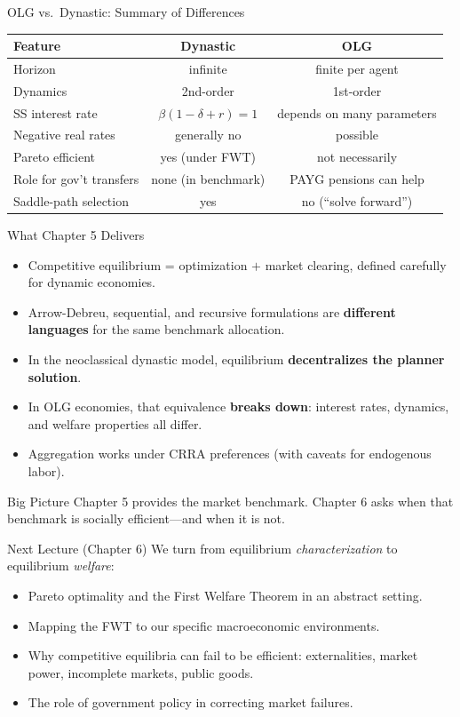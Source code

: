 \documentclass[aspectratio=169,10pt]{beamer}
\begin{document}
\begin{frame}{OLG vs.\ Dynastic: Summary of Differences}
\begin{center}
\begin{tabular}{lcc}
\toprule
\textbf{Feature} & \textbf{Dynastic} & \textbf{OLG} \\
\midrule
Horizon & infinite & finite per agent \\
Dynamics & 2nd-order & 1st-order \\
SS interest rate & $\beta(1-\delta+r)=1$ & depends on many parameters \\
Negative real rates & generally no & possible \\
Pareto efficient & yes (under FWT) & not necessarily \\
Role for gov't transfers & none (in benchmark) & PAYG pensions can help \\
Saddle-path selection & yes & no (``solve forward'') \\
\bottomrule
\end{tabular}
\end{center}
\end{frame}

\begin{frame}{What Chapter 5 Delivers}
\begin{itemize}
  \item Competitive equilibrium = optimization $+$ market clearing, defined carefully for dynamic economies.
  \item Arrow-Debreu, sequential, and recursive formulations are \textbf{different languages} for the same benchmark allocation.
  \item In the neoclassical dynastic model, equilibrium \textbf{decentralizes the planner solution}.
  \item In OLG economies, that equivalence \textbf{breaks down}: interest rates, dynamics, and welfare properties all differ.
  \item Aggregation works under CRRA preferences (with caveats for endogenous labor).
\end{itemize}

\begin{block}{Big Picture}
Chapter 5 provides the market benchmark. Chapter 6 asks when that benchmark is socially efficient---and when it is not.
\end{block}
\end{frame}

\begin{frame}{Next Lecture (Chapter 6)}
We turn from equilibrium \emph{characterization} to equilibrium \emph{welfare}:
\begin{itemize}
  \item Pareto optimality and the First Welfare Theorem in an abstract setting.
  \item Mapping the FWT to our specific macroeconomic environments.
  \item Why competitive equilibria can fail to be efficient: externalities, market power, incomplete markets, public goods.
  \item The role of government policy in correcting market failures.
\end{itemize}
\end{frame}
\end{document}
